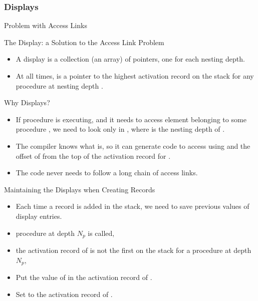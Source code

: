 \begin{bibunit}[apalike]
\subsubsection{Displays}

\tableofcontentslide[sections={1-4},sectionstyle={show/shaded},subsectionstyle={show/shaded/hide},subsubsectionstyle={show/shaded/hide/hide}]

\begin{frame}{Problem with Access Links}
\end{frame}

\begin{frame}{The Display: a Solution to the Access Link Problem}
	\vfill
	\begin{itemize}
	\item A display is a collection (an array) of pointers, one for each nesting depth.
	\vfill
	\item At all times,  is a pointer to the highest activation record on the stack for any procedure at nesting depth .
	\end{itemize}
\end{frame}

\begin{frame}{Why Displays?}
	\begin{itemize}
	\item If procedure  is executing, and it needs to access element  belonging to some procedure , we need to look only in , where  is the nesting depth of .
	\vfill
	\item The compiler knows what  is, so it can generate code to access  using  and the offset of  from the top of the activation record for .
	\vfill
	\item The code never needs to follow a long chain of access links.
	\end{itemize}
\end{frame}

\begin{frame}{Maintaining the Displays when Creating Records}
	\begin{itemize}
	\item Each time a record is added in the stack, we need to save previous values of display entries.
	\vfill
	\item {} procedure  at depth $N_p$ is called, 
	\item the activation record of  is not the first on the stack for a procedure at depth $N_p$, 
	\vfill
	\item Put the value of  in the activation record of .
	\item Set  to the activation record of .
	\end{itemize}
\end{frame}


\end{bibunit}
